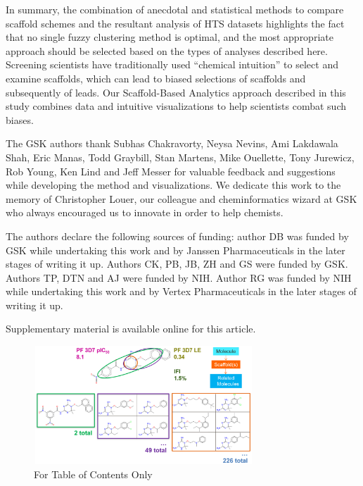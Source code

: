 \documentclass[journal=jacsat,biochem,manuscript=article]{achemso}
\begin{document}
In summary, the combination of anecdotal and statistical methods to
compare scaffold schemes and the resultant analysis of HTS datasets
highlights the fact that no single fuzzy clustering method is optimal,
and the most appropriate approach should be selected based on the
types of analyses described here. Screening scientists have traditionally
used ``chemical intuition'' to select and examine scaffolds, which can 
lead to biased selections of scaffolds and subsequently of
leads. Our Scaffold-Based Analytics approach described in this study
combines data and intuitive visualizations to help scientists combat such biases. 


\begin{acknowledgement}
  The GSK authors thank Subhas Chakravorty, Neysa Nevins, Ami Lakdawala Shah,
  Eric Manas, Todd Graybill, Stan Martens, Mike Ouellette, Tony Jurewicz, Rob
  Young, Ken Lind and Jeff Messer for valuable feedback and suggestions while developing the method and visualizations. We dedicate this work to the memory of Christopher Louer, our colleague and cheminformatics wizard at GSK who always encouraged us to innovate in order to help chemists.

The authors declare the following sources of funding: author DB was funded by GSK while undertaking this work and by Janssen Pharmaceuticals in the later stages of writing it up. Authors CK, PB, JB, ZH and GS were funded by GSK. Authors TP, DTN and AJ were funded by NIH. Author RG was funded by NIH while undertaking this work and by Vertex Pharmaceuticals in the later stages of writing it up.      
\end{acknowledgement}

\begin{suppinfo}
Supplementary material is available online for this article.
\end{suppinfo}


\newpage
\begin{figure}
  \includegraphics[width=3.25in,height=1.75in]{fig/TOC_image_v4.png}
  \caption{For Table of Contents Only}
\end{figure}
\end{document}
